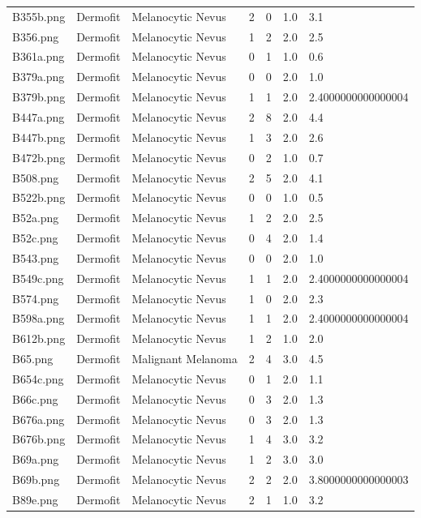 \begin{longtable}{ | l | l | l | l | l | l | l |}
B355b.png & Dermofit & Melanocytic Nevus & 2 & 0 & 1.0 & 3.1 \\
B356.png & Dermofit & Melanocytic Nevus & 1 & 2 & 2.0 & 2.5 \\
B361a.png & Dermofit & Melanocytic Nevus & 0 & 1 & 1.0 & 0.6 \\
B379a.png & Dermofit & Melanocytic Nevus & 0 & 0 & 2.0 & 1.0 \\
B379b.png & Dermofit & Melanocytic Nevus & 1 & 1 & 2.0 & 2.4000000000000004 \\
B447a.png & Dermofit & Melanocytic Nevus & 2 & 8 & 2.0 & 4.4 \\
B447b.png & Dermofit & Melanocytic Nevus & 1 & 3 & 2.0 & 2.6 \\
B472b.png & Dermofit & Melanocytic Nevus & 0 & 2 & 1.0 & 0.7 \\
B508.png & Dermofit & Melanocytic Nevus & 2 & 5 & 2.0 & 4.1 \\
B522b.png & Dermofit & Melanocytic Nevus & 0 & 0 & 1.0 & 0.5 \\
B52a.png & Dermofit & Melanocytic Nevus & 1 & 2 & 2.0 & 2.5 \\
B52c.png & Dermofit & Melanocytic Nevus & 0 & 4 & 2.0 & 1.4 \\
B543.png & Dermofit & Melanocytic Nevus & 0 & 0 & 2.0 & 1.0 \\
B549c.png & Dermofit & Melanocytic Nevus & 1 & 1 & 2.0 & 2.4000000000000004 \\
B574.png & Dermofit & Melanocytic Nevus & 1 & 0 & 2.0 & 2.3 \\
B598a.png & Dermofit & Melanocytic Nevus & 1 & 1 & 2.0 & 2.4000000000000004 \\
B612b.png & Dermofit & Melanocytic Nevus & 1 & 2 & 1.0 & 2.0 \\
B65.png & Dermofit & Malignant Melanoma & 2 & 4 & 3.0 & 4.5 \\
B654c.png & Dermofit & Melanocytic Nevus & 0 & 1 & 2.0 & 1.1 \\
B66c.png & Dermofit & Melanocytic Nevus & 0 & 3 & 2.0 & 1.3 \\
B676a.png & Dermofit & Melanocytic Nevus & 0 & 3 & 2.0 & 1.3 \\
B676b.png & Dermofit & Melanocytic Nevus & 1 & 4 & 3.0 & 3.2 \\
B69a.png & Dermofit & Melanocytic Nevus & 1 & 2 & 3.0 & 3.0 \\
B69b.png & Dermofit & Melanocytic Nevus & 2 & 2 & 2.0 & 3.8000000000000003 \\
B89e.png & Dermofit & Melanocytic Nevus & 2 & 1 & 1.0 & 3.2 \\

\end{longtable}
